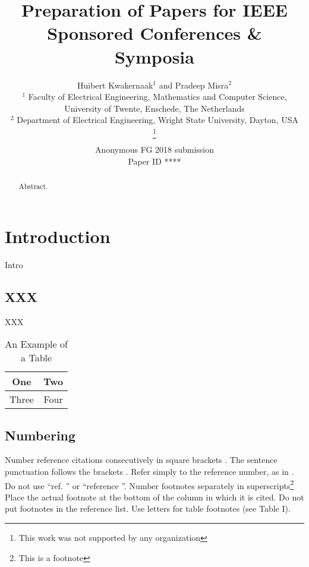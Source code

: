 \documentclass[a4paper, 10pt, conference]{ieeeconf}      %
\title{\LARGE \bf
Preparation of Papers for IEEE Sponsored Conferences \& Symposia
}
\author{\parbox{16cm}{\centering
    {\large Huibert Kwakernaak$^1$ and Pradeep Misra$^2$}\\
    {\normalsize
    $^1$ Faculty of Electrical Engineering, Mathematics and Computer Science, University of Twente, Enschede, The Netherlands\\
    $^2$ Department of Electrical Engineering, Wright State University, Dayton, USA}}
    \thanks{This work was not supported by any organization}%
}
\def\FGPaperID{****} %
\begin{document}
\ifFGfinal
\thispagestyle{empty}
\pagestyle{empty}
\else
\author{Anonymous FG 2018 submission\\ Paper ID \FGPaperID \\}
\pagestyle{plain}
\fi
\maketitle



\begin{abstract}

Abstract. 

\end{abstract}


\section{Introduction}

Intro

\subsection{XXX}

XXX

\begin{table}
\caption{An Example of a Table}
\label{table_example}
\begin{center}
\begin{tabular}{|c||c|}
\hline
One & Two\\
\hline
Three & Four\\
\hline
\end{tabular}
\end{center}
\end{table}



\subsection{Numbering}

Number reference citations consecutively in square brackets \cite{c1}.
 The sentence punctuation follows the brackets \cite{c2}.
 Refer simply to the reference number, as in \cite{c3}.
 Do not use ``ref. \cite{c3}'' or ``reference \cite{c3}''.
Number footnotes separately in superscripts\footnote{This is a footnote}
Place the actual footnote at the bottom of the column in which it is cited.
Do not put footnotes in the reference list.
Use letters for table footnotes (see Table I).
\end{document}
